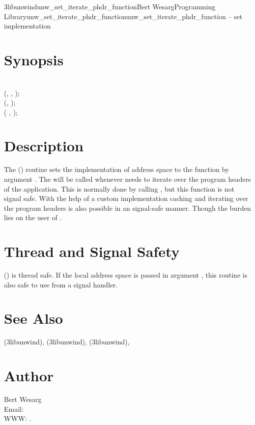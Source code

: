 \documentclass{article}
\begin{document}
\begin{Name}{3libunwind}{unw\_set\_iterate\_phdr\_function}{Bert Wesarg}{Programming Library}{unw\_set\_iterate\_phdr\_function}unw\_set\_iterate\_phdr\_function -- set  implementation
\end{Name}

\section{Synopsis}


\\

\noindent
{}
(,
        , );\\
\noindent
{} (,
        );\\

\noindent
{} (
        ,  );\\

\section{Description}

The () routine sets the  implementation of address space  to the function by argument .
The  will be called whenever  needs to iterate over the program headers of the application.
This is normally done by calling , but this function is not signal safe.
With the help of a custom implementation caching and iterating over the program headers is also possible in an signal-safe manner.
Though the burden lies on the user of .

\section{Thread and Signal Safety}

() is thread safe.  If the local address space
is passed in argument , this routine is also safe to use from
a signal handler.


\section{See Also}

(3libunwind),
(3libunwind),
(3libunwind),

\section{Author}

\noindent
Bert Wesarg\\
Email: \\
WWW: .
\LatexManEnd
\end{document}
